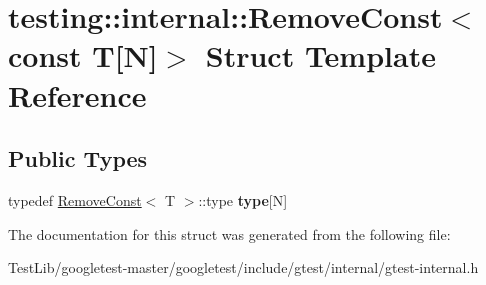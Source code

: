 \hypertarget{structtesting_1_1internal_1_1RemoveConst_3_01const_01T[N]_4}{}\section{testing\+:\+:internal\+:\+:Remove\+Const$<$ const T\mbox{[}N\mbox{]}$>$ Struct Template Reference}
\label{structtesting_1_1internal_1_1RemoveConst_3_01const_01T[N]_4}
\subsection*{Public Types}
\begin{DoxyCompactItemize}
\item 
\mbox{\label{structtesting_1_1internal_1_1RemoveConst_3_01const_01T[N]_4_ac976b53cb5d031a120fafbe790650068}} 
typedef \hyperlink{structtesting_1_1internal_1_1RemoveConst}{Remove\+Const}$<$ T $>$\+::type {\bfseries type}\mbox{[}N\mbox{]}
\end{DoxyCompactItemize}


The documentation for this struct was generated from the following file\+:\begin{DoxyCompactItemize}
\item 
Test\+Lib/googletest-\/master/googletest/include/gtest/internal/gtest-\/internal.\+h\end{DoxyCompactItemize}
